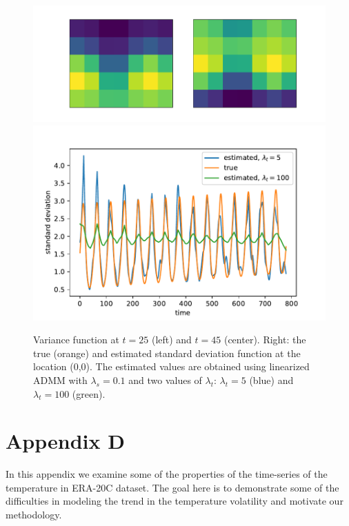 \documentclass{article}
\begin{document}
\begin{figure}[tb]
  \centering	
  \includegraphics[height=.15\textheight]{Figures/true_var_spatial}
  \includegraphics[height=.15\textheight]{Figures/true_fitted_var}
  \caption{Variance function at $t=25$ (left) and $t=45$
    (center). Right: the true (orange) and estimated standard deviation 
    function at the location (0,0). The estimated values are
    obtained using linearized ADMM with $\lambda_s=0.1$ and two
    values of $\lambda_t$: $\lambda_t=5$ (blue) and
    $\lambda_t=100$ (green).} \label{fig:true_var_spatial}
\end{figure}

\section{Appendix D}

In this appendix we examine some of the properties of the time-series of the temperature in ERA-20C dataset. The goal here is to demonstrate some of the difficulties in modeling the trend in the temperature volatility and motivate our methodology.
\end{document}
